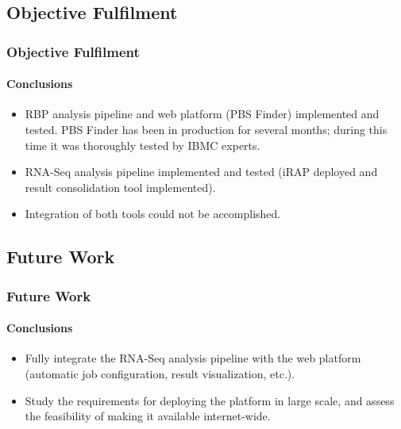 \documentclass{beamer}
\begin{document}
\subsection{Objective Fulfilment}
\begin{frame}
  \frametitle{Objective Fulfilment}
  \framesubtitle{Conclusions}

\begin{itemize}
\item
RBP analysis pipeline and web platform (PBS Finder) implemented and tested. PBS
Finder has been in production for several months; during this time it was
thoroughly tested by IBMC experts.\\ \vspace{0.8cm}

\item
RNA-Seq analysis pipeline implemented and tested (iRAP deployed and result
consolidation tool implemented).\\ \vspace{0.8cm}

\item
Integration of both tools could not be accomplished.
\end{itemize}


\end{frame}

\subsection{Future Work}
\begin{frame}
  \frametitle{Future Work}
  \framesubtitle{Conclusions}

\begin{itemize}
\item
Fully integrate the RNA-Seq analysis pipeline with the web platform (automatic
job configuration, result visualization, etc.).\\ \vspace{1.2cm}

\item
Study the requirements for deploying the platform in large scale, and assess the
feasibility of making it available internet-wide.
\end{itemize}


\end{frame}
\end{document}
